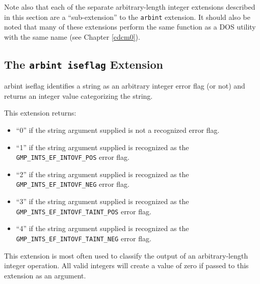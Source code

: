 Note also that each of the separate arbitrary-length integer extensions described
in this section are a ``sub-extension'' to the \texttt{arbint} extension.  It
should also be noted
that many of these extensions perform the same function as a DOS
utility with the same name (see Chapter \ref{cdcm0}).


\subsection{The \texttt{arbint iseflag} Extension}

\begin{tclcommandname}{arbint iseflag}%
identifies a string as an arbitrary integer error flag (or not) and
returns an integer value categorizing the string.
\end{tclcommandname}

\begin{tclcommandsynopsis}
\end{tclcommandsynopsis}

\begin{tclcommanddescription}
This extension returns:
\begin{itemize}
\item ``0'' if the string argument supplied is not a recognized
      error flag.
\item ``1'' if the string argument supplied is recognized as the\\
      \texttt{GMP\_INTS\_EF\_INTOVF\_POS}
	  error flag.
\item ``2'' if the string argument supplied is recognized as the\\
      \texttt{GMP\_INTS\_EF\_INTOVF\_NEG}
	  error flag.
\item ``3'' if the string argument supplied is recognized as the\\
      \texttt{GMP\_INTS\_EF\_INTOVF\_TAINT\_POS}
	  error flag.
\item ``4'' if the string argument supplied is recognized as the\\
      \texttt{GMP\_INTS\_EF\_INTOVF\_TAINT\_NEG}
	  error flag.
\end{itemize}

This extension is most often used to classify the output of an
arbitrary-length integer operation.  All valid integers will create
a value of zero if passed to this extension as an argument.
\end{tclcommanddescription}

